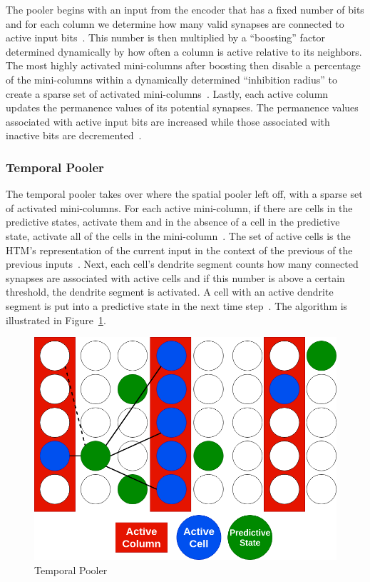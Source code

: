 \documentclass[oneside,12pt,openany]{book}
\begin{document}
	
	The pooler begins with an input from the encoder that has a fixed number of bits and for each column we determine how many valid synapses are connected to active input bits~\cite{Whitepaper}. This number is then multiplied by a ``boosting'' factor determined dynamically by how often a column is active relative to its neighbors. The most highly activated mini-columns after boosting then disable a percentage of the mini-columns within a dynamically determined ``inhibition radius'' to create a sparse set of activated mini-columns~\cite{Whitepaper}. Lastly, each active column updates the permanence values of its potential synapses. The permanence values associated with active input bits are increased while those associated with inactive bits are decremented~\cite{Whitepaper}.

	
	\subsubsection{Temporal Pooler}

	The temporal pooler takes over where the spatial pooler left off, with a sparse set of activated mini-columns. For each active mini-column, if there are cells in the predictive states, activate them and in the absence of a cell in the predictive state, activate all of the cells in the mini-column~\cite{Whitepaper}. The set of active cells is the HTM's representation of the current input in the context of the previous of the previous inputs~\cite{BAMI}. Next, each cell's dendrite segment counts how many connected synapses are associated with active cells and if this number is above a certain threshold, the dendrite segment is activated. A cell with an active dendrite segment is put into a predictive state in the next time step~\cite{BAMI}. The algorithm is illustrated in Figure~\ref{fig:TemporalPooler}.
	
	

	\begin{figure}[!ht]
		\centering
		\includegraphics[width=.8\linewidth]{images/TemporalPooler.png}
		\caption{Temporal Pooler}
		\label{fig:TemporalPooler}
	\end{figure}
\end{document}

